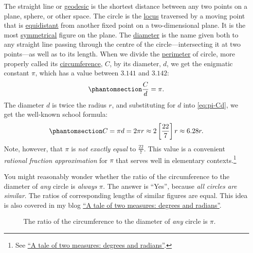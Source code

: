 \documentclass[
  a4paper,
]{article}
\begin{document}
The straight line or
\href{https://mathworld.wolfram.com/Geodesic.html}{geodesic} is the
shortest distance between any two points on a plane, sphere, or other
space. The circle is the
\href{https://en.wikipedia.org/wiki/Locus_(mathematics)}{locus}
traversed by a moving point that is
\href{https://en.wikipedia.org/wiki/Equidistant}{equidistant} from
another fixed point on a two-dimensional plane. It is the most
\href{https://mathworld.wolfram.com/Symmetry.html}{symmetrical} figure
on the plane. The
\href{https://en.wikipedia.org/wiki/Diameter}{diameter} is the name
given both to any straight line passing through the centre of the
circle---intersecting it at two points---as well as to its length. When
we divide the \href{https://en.wikipedia.org/wiki/Perimeter}{perimeter}
of circle, more properly called its
\href{https://en.wikipedia.org/wiki/Circumference}{circumference},
\(C\), by its diameter, \(d\), we get the enigmatic constant \(\pi\),
which has a value between \(3.141\) and \(3.142\):
\begin{equation}\phantomsection\label{eq:pi-Cd}{
\frac{C}{d} = \pi.
}\end{equation} The diameter \(d\) is twice the radius \(r\), and
substituting for \(d\) into \cref{eq:pi-Cd}, we get the well-known
school formula: \begin{equation}\phantomsection\label{eq:two-pi-r}{
C = \pi d = 2\pi r \approx 2\left[\frac{22}{7}\right]r \approx 6.28r.
}\end{equation} Note, however, that \(\pi\) is \emph{not exactly equal}
to \(\frac{22}{7}\). This value is a convenient \emph{rational fraction
approximation} for \(\pi\) that serves well in elementary
contexts.\footnote{See
  \href{https://swanlotus.netlify.app/blogs/a-tale-of-two-measures-degrees-and-radians}{``A
  tale of two measures: degrees and radians''}.}

You might reasonably wonder whether the ratio of the circumference to
the diameter of \emph{any} circle is \emph{always} \(\pi\). The answer
is ``Yes'', because \emph{all circles are similar}. The ratios of
corresponding lengths of similar figures are equal. This idea is also
covered in my blog
\href{https://swanlotus.netlify.app/blogs/a-tale-of-two-measures-degrees-and-radians}{``A
tale of two measures: degrees and radians''}.

\begin{figure}
\centering

\caption{The ratio of the circumference to the diameter of \emph{any}
circle is \(\pi\).}\label{fig:pi-circle}
\end{figure}
\end{document}
